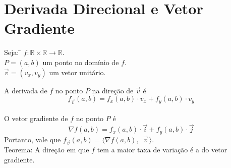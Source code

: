 \documentclass{article}
\begin{document}
\section{Derivada Direcional e Vetor Gradiente}
\begin{tabbing}
Seja: \= $f : \mathbb{R} \times \mathbb{R} \rightarrow \mathbb{R}$. \\[5pt]
  \> $P = (a, b)$ um ponto no domínio de $f$. \\[5pt]
  \> $\vec{v} = (v_x, v_y)$ um vetor unitário.
\end{tabbing}
\vspace{10pt}
A derivada de $f$ no ponto $P$ na direção de $\vec{v}$ é
\[ f_{\vec{v}}(a,b) = f_x(a,b) \cdot v_x + f_y(a,b) \cdot v_y \] \\
O vetor gradiente de $f$ no ponto $P$ é
\[ \nabla f(a,b) = f_x(a,b) \cdot \vec{i} + f_y(a,b) \cdot \vec{j} \]
Portanto, vale que $f_{\vec{v}}(a,b) = \langle \nabla f(a,b), \enspace \vec{v} \, \rangle$. \\[20pt]
Teorema: A direção em que $f$ tem a maior taxa de variação é a do vetor gradiente.
\end{document}
